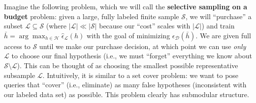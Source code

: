 Imagine the following problem, which we will call the \textbf{selective sampling on a budget} problem: given a large, fully labeled finite sample $\mathcal{S}$, we will ``purchase'' a subset $\mathcal{L} \subseteq \mathcal{S}$ (where $|\mathcal{L}| \ll |\mathcal{S}|$ because our ``cost'' scales with $|\mathcal{L}|$) and train $\bar{h} = \arg\max_{h \in \mathcal{H}} \hat{\epsilon}_{\mathcal{L}}(h)$ with the goal of minimizing $\epsilon_{\mathcal{D}}(\bar{h})$. We are given full access to $\mathcal{S}$ until we make our purchase decision, at which point we can use \textit{only} $\mathcal{L}$ to choose our final hypothesis (i.e., we must ``forget'' everything we know about $\mathcal{S} \setminus \mathcal{L}$). This can be thought of as choosing the smallest possible representative subsample $\mathcal{L}$. Intuitively, it is similar to a set cover problem: we want to pose queries that ``cover'' (i.e., eliminate) as many false hypotheses (inconsistent with our labeled data set) as possible. This problem clearly has submodular structure.\\

